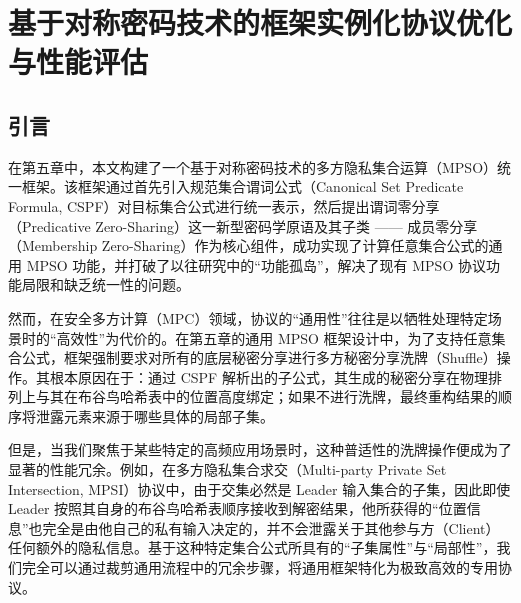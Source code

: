 \chapter{基于对称密码技术的框架实例化协议优化与性能评估}

\section{引言}

在第五章中，本文构建了一个基于对称密码技术的多方隐私集合运算（MPSO）统一框架。该框架通过首先引入规范集合谓词公式（Canonical Set Predicate Formula, CSPF）对目标集合公式进行统一表示，然后提出谓词零分享（Predicative Zero-Sharing）这一新型密码学原语及其子类 —— 成员零分享（Membership Zero-Sharing）作为核心组件，成功实现了计算任意集合公式的通用 MPSO 功能，并打破了以往研究中的“功能孤岛”，解决了现有 MPSO 协议功能局限和缺乏统一性的问题。

然而，在安全多方计算（MPC）领域，协议的“通用性”往往是以牺牲处理特定场景时的“高效性”为代价的。在第五章的通用 MPSO 框架设计中，为了支持任意集合公式，框架强制要求对所有的底层秘密分享进行多方秘密分享洗牌（Shuffle）操作。其根本原因在于：通过 CSPF 解析出的子公式，其生成的秘密分享在物理排列上与其在布谷鸟哈希表中的位置高度绑定；如果不进行洗牌，最终重构结果的顺序将泄露元素来源于哪些具体的局部子集。

但是，当我们聚焦于某些特定的高频应用场景时，这种普适性的洗牌操作便成为了显著的性能冗余。例如，在多方隐私集合求交（Multi-party Private Set Intersection, MPSI）协议中，由于交集必然是 Leader 输入集合的子集，因此即使 Leader 按照其自身的布谷鸟哈希表顺序接收到解密结果，他所获得的“位置信息”也完全是由他自己的私有输入决定的，并不会泄露关于其他参与方（Client）任何额外的隐私信息。基于这种特定集合公式所具有的“子集属性”与“局部性”，我们完全可以通过裁剪通用流程中的冗余步骤，将通用框架特化为极致高效的专用协议。

